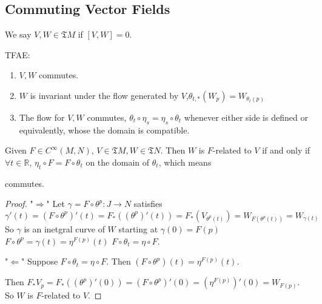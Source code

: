  \subsection{Commuting Vector Fields}
\begin{definition}
    We say  $ V,W\in\mathfrak{T}M $  if  $ [V,W]=0 $.  
\end{definition}
 \begin{theorem}\label{Equivalent condition of Commuting vector fields}
    TFAE:
    \begin{enumerate}[label=\arabic*]
        \item  $ V,W $ commutes.
        \item   $ W $ is invariant under the flow generated by  $ V $,\ie  $ \theta_{t,*}(W_p)=W_{\theta_t(p)} $
        \item The flow for  $ V,W $ commutes, \ie  $ \theta_t\circ \eta_s=\eta_s\circ \theta_t $ whenever either side is defined or equivalently, whose the domain is compatible.     
    \end{enumerate}
 \end{theorem}
\begin{lemma}
     Given  $ F\in C^\infty(M,N) $,  $ V\in\mathfrak{T}M ,W\in \mathfrak{T}N$. Then  $ W $ is  $ F $-related to  $ V $ if and only  if  $ \forall t\in \mathbb{R} $,  $ \eta_t\circ F=F\circ \theta_t $ on the domain of  $ \theta_t $, which means 
    \begin{center}
        commutes.
    \end{center}
    
      
\end{lemma}
\begin{proof}
    "$ \Rightarrow $" Let  $ \gamma=F\circ \theta^p:J\rightarrow N $ satisfies 
     \[\gamma'(t)=(F\circ \theta^p)'(t)=F_*((\theta^p)'(t))=F_*(V_{\theta^p(t)})=W_{F(\theta^p(t))}=W_{\gamma(t)}\]
     So  $ \gamma $ is an inetgral curve of  $ W $ starting at  $ \gamma(0)=F(p) $\ie  $ F\circ \theta^p =\gamma(t)=\eta^{F(p)}(t)$ \ie  $ F\circ \theta_t=\eta\circ F $.
     
     "$ \Leftarrow $" Suppose  $ F\circ \theta_t =\eta\circ F $. Then   $ (F\circ \theta^p)(t)=\eta^{F(p)}(t) $.
     
     Then  $ F_*V_p=F_*((\theta^p)'(0))=(F\circ \theta^p)'(0)=(\eta^{F(p)})'(0)=W_{F(p)} $. So  $ W $ is  $ F $-related to  $ V $.   
\end{proof}
